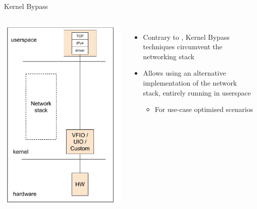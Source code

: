 \begin{frame}{Kernel Bypass}
	\begin{columns}
		\includegraphics[width=\textwidth]{slides/networking-stack-overview/kernel_bypass.pdf}
	\begin{itemize}
		\item Contrary to , Kernel Bypass techniques circumvent the networking stack
		\item Allows using an alternative implementation of the network stack, entirely running in userspace
			\begin{itemize}
				\item For use-case optimised scenarios
			\end{itemize}

\end{itemize}
\end{columns}
\end{frame}

